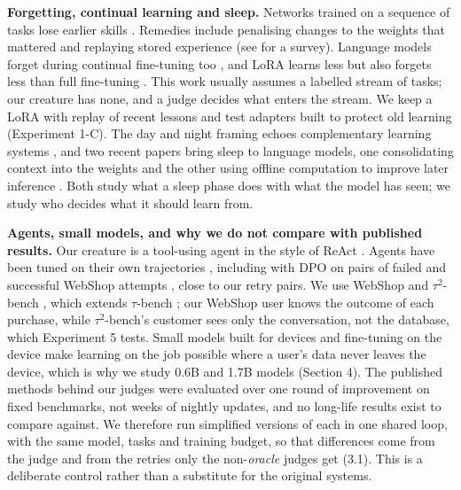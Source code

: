 \textbf{Forgetting, continual learning and sleep.} Networks trained on a sequence of tasks lose earlier skills \cite{mccloskey1989catastrophic}. Remedies include penalising changes to the weights that mattered \cite{kirkpatrick2017overcoming} and replaying stored experience \cite{rolnick2019experience} (see \cite{delange2022continual} for a survey). Language models forget during continual fine-tuning too \cite{luo2025empirical}, and LoRA \cite{hu2022lora} learns less but also forgets less than full fine-tuning \cite{biderman2024lora}. This work usually assumes a labelled stream of tasks; our creature has none, and a judge decides what enters the stream. We keep a LoRA with replay of recent lessons and test adapters built to protect old learning (Experiment 1-C). The day and night framing echoes complementary learning systems \cite{mcclelland1995why}, and two recent papers bring sleep to language models, one consolidating context into the weights \cite{behrouz2026language} and the other using offline computation to improve later inference \cite{lee2026do}. Both study what a sleep phase does with what the model has seen; we study who decides what it should learn from.

\textbf{Agents, small models, and why we do not compare with published results.} Our creature is a tool-using agent in the style of ReAct \cite{yao2023react}. Agents have been tuned on their own trajectories \cite{zeng2024agenttuning}, including with DPO on pairs of failed and successful WebShop attempts \cite{song2024trial}, close to our retry pairs. We use WebShop \cite{yao2022webshop} and $\tau^2$-bench \cite{barres2026tau2}, which extends $\tau$-bench \cite{yao2025taubench}; our WebShop user knows the outcome of each purchase, while $\tau^2$-bench's customer sees only the conversation, not the database, which Experiment 5 tests. Small models built for devices \cite{liu2024mobilellm, yang2025qwen3} and fine-tuning on the device \cite{zhu2023pockengine} make learning on the job possible where a user's data never leaves the device, which is why we study 0.6B and 1.7B models (Section 4). The published methods behind our judges were evaluated over one round of improvement on fixed benchmarks, not weeks of nightly updates, and no long-life results exist to compare against. We therefore run simplified versions of each in one shared loop, with the same model, tasks and training budget, so that differences come from the judge and from the retries only the non-\emph{oracle} judges get (3.1). This is a deliberate control rather than a substitute for the original systems.
